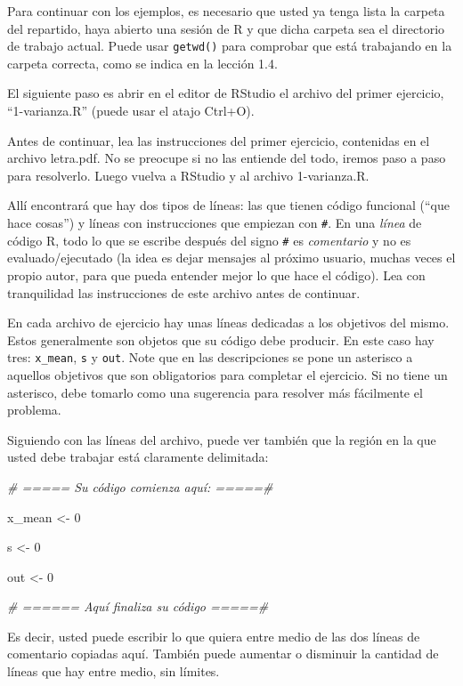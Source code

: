 \documentclass[]{article}
\newenvironment{Shaded}{}{}
\newcommand{\DecValTok}[1]{\textcolor[rgb]{0.25,0.63,0.44}{{#1}}}
\newcommand{\CommentTok}[1]{\textcolor[rgb]{0.38,0.63,0.69}{\textit{{#1}}}}
\newcommand{\NormalTok}[1]{{#1}}
\begin{document}
Para continuar con los ejemplos, es necesario que usted ya tenga lista
la carpeta del repartido, haya abierto una sesión de R y que dicha
carpeta sea el directorio de trabajo actual. Puede usar \texttt{getwd()}
para comprobar que está trabajando en la carpeta correcta, como se
indica en la lección 1.4.

El siguiente paso es abrir en el editor de RStudio el archivo del primer
ejercicio, ``1-varianza.R'' (puede usar el atajo Ctrl+O).

Antes de continuar, lea las instrucciones del primer ejercicio,
contenidas en el archivo letra.pdf. No se preocupe si no las entiende
del todo, iremos paso a paso para resolverlo. Luego vuelva a RStudio y
al archivo 1-varianza.R.

Allí encontrará que hay dos tipos de líneas: las que tienen código
funcional (``que hace cosas'') y líneas con instrucciones que empiezan
con \texttt{\#}. En una \emph{línea} de código R, todo lo que se escribe
después del signo \texttt{\#} es \emph{comentario} y no es
evaluado/ejecutado (la idea es dejar mensajes al próximo usuario, muchas
veces el propio autor, para que pueda entender mejor lo que hace el
código). Lea con tranquilidad las instrucciones de este archivo antes de
continuar.

En cada archivo de ejercicio hay unas líneas dedicadas a los objetivos
del mismo. Estos generalmente son objetos que su código debe producir.
En este caso hay tres: \texttt{x\_mean}, \texttt{s} y \texttt{out}. Note
que en las descripciones se pone un asterisco a aquellos objetivos que
son obligatorios para completar el ejercicio. Si no tiene un asterisco,
debe tomarlo como una sugerencia para resolver más fácilmente el
problema.

Siguiendo con las líneas del archivo, puede ver también que la región en
la que usted debe trabajar está claramente delimitada:

\begin{Shaded}
\begin{Highlighting}[]
\CommentTok{# ===== Su código comienza aquí: =====#}

\NormalTok{x_mean <- }\DecValTok{0}

\NormalTok{s <- }\DecValTok{0}

\NormalTok{out <- }\DecValTok{0}

\CommentTok{# ====== Aquí finaliza su código =====#}
\end{Highlighting}
\end{Shaded}
Es decir, usted puede escribir lo que quiera entre medio de las dos
líneas de comentario copiadas aquí. También puede aumentar o disminuir
la cantidad de líneas que hay entre medio, sin límites.
\end{document}
